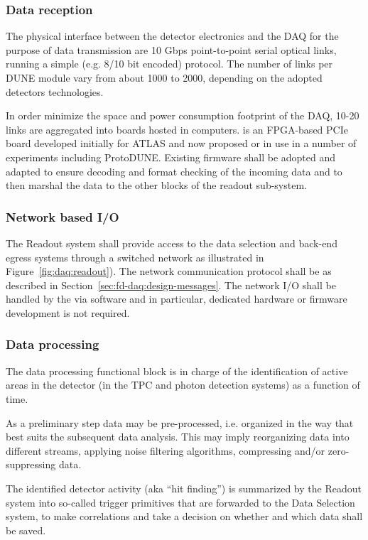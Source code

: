 \subsubsection{Data reception}

The physical interface between the detector electronics and the DAQ for the purpose of data transmission are 10 Gbps point-to-point serial optical links, running a simple (e.g. 8/10 bit encoded) protocol. 
The number of links per DUNE module vary from about 1000 to 2000, depending on the adopted detectors technologies.

In order minimize the space and power consumption footprint of the DAQ, 10-20 links are aggregated into  boards hosted in  computers. 
 is an FPGA-based PCIe board developed initially for ATLAS and now proposed or in use in a number of experiments including ProtoDUNE. 
Existing firmware shall be adopted and adapted to ensure decoding and format checking of the incoming data and to then marshal the data to the other blocks of the readout sub-system.

\subsubsection{Network based I/O}

The Readout system shall provide access to the data selection and back-end egress systems through a  switched network as illustrated in Figure~\ref{fig:daq:readout}).
The network communication protocol shall be as described in Section~\ref{sec:fd-daq:design-messages}.
The network I/O shall be handled by the  via software and in particular, dedicated hardware or firmware development is not required.

\subsubsection{Data processing}

The data processing functional block is in charge of the identification of active areas in the detector (in the TPC and photon detection systems) as a function of time.

As a preliminary step data may be pre-processed, i.e. organized in the way that best suits the subsequent data analysis. This may imply reorganizing data into different streams, applying noise filtering algorithms, compressing and/or zero-suppressing data.

The identified detector activity (aka ``hit finding'') is summarized by the Readout system into so-called trigger primitives that are forwarded to the Data Selection system, to make correlations and take a decision on whether and which data shall be saved.

